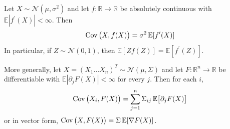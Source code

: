   \begin{lemma}
    \label{thm:gaussian-ibp}
    Let $X \sim \mathcal{N}(\mu, \sigma^2)$ and let $f: \mathbb{R} \rightarrow \mathbb{R}$ be absolutely continuous with $\mathbb{E}|f^\prime (X)| < \infty$. Then 
    \begin{equation}
      \operatorname{Cov} \big( X, f(X) \big) = \sigma^2 \, \mathbb{E}[f^\prime (X)]
    \end{equation}
    In particular, if $Z \sim \mathcal{N}(0, 1)$, then $\mathbb{E}[Z f(Z)] = \mathbb{E}[f^\prime (Z)]$. 

    More generally, let $X = (X_1 \ldots X_n)^T \sim \mathcal{N}(\mu, \Sigma)$ and let $F: \mathbb{R}^n \rightarrow \mathbb{R}$ be differentiable with $\mathbb{E}| \partial_j F (X)| < \infty$ for every $j$. Then for each $i$, 
    \begin{equation}
      \operatorname{Cov} \big( X_i, F(X) \big) = \sum_{j=1}^n \Sigma_{ij} \, \mathbb{E} \big[ \partial_j F (X) \big] 
    \end{equation}
    or in vector form, $\operatorname{Cov} \big( X, F(X) \big) = \Sigma \, \mathbb{E}[\nabla F (X)]$. 
  \end{lemma}

